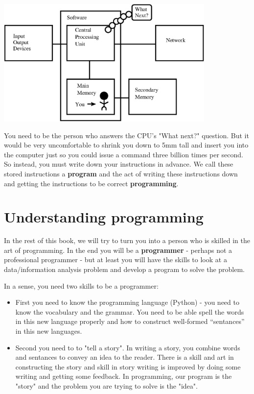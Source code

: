 \documentclass[10pt]{book}
\begin{document}
\beforefig
\centerline{\includegraphics[height=2.50in]{figs2/arch2.eps}}
\afterfig

You need to be the person who answers the CPU's "What next?" 
question.  But it would be very uncomfortable to shrink you 
down to 5mm tall and insert you into the computer just so you 
could issue a command three billion times per second.  So instead,
you must write down your instructions in advance.
We call these stored instructions a {\bf program} and the act 
of writing these instructions down and getting the instructions to 
be correct {\bf programming}.

\section{Understanding programming}

In the rest of this book, we will try to turn you into a person
who is skilled in the art of programming.  In the end you will be a 
{\bf programmer} - perhaps not a professional programmer - but 
at least you will have the skills to look at a data/information
analysis problem and develop a program to solve the problem.


In a sense, you need two skills to be a programmer:

\begin{itemize}

\item First you need to know the programming language (Python) -
you need to know the vocabulary and the grammar.  You need to be able 
spell the words in this new language properly and how to construct 
well-formed ``sentances'' in this new languages.

\item Second you need to to "tell a story".  In writing a story,
you combine words and sentances to convey an idea to the reader. 
There is a skill and art in constructing the story and skill in
story writing is improved by doing some writing and getting some
feedback.  In programming, our program is the "story" and the 
problem you are trying to solve is the "idea".

\end{itemize}
\end{document}
